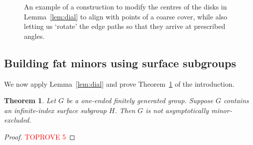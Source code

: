 \documentclass[10pt,a4paper]{amsart}
\newtheorem{theorem}{Theorem}[section]
\theoremstyle{definition}
\begin{document}
\begin{figure}[t]

\caption{An example of a construction to modify the centres of the disks in Lemma~\ref{lem:dial} to align with points of a coarse cover, while also letting us `rotate' the edge paths so that they arrive at prescribed angles. }\label{fig:circles}

\end{figure}
	


\subsection{Building fat minors using surface subgroups}

We now apply Lemma~\ref{lem:dial} and prove Theorem~\ref{thm:surface-subgroup} of the introduction. 


\begin{theorem}\label{thm:surface-subgroup}
	Let $G$ be a one-ended finitely generated group. Suppose $G$ contains an infinite-index surface subgroup $H$. Then $G$ is not asymptotically minor-excluded. 
\end{theorem}


\begin{proof}\textcolor{red}{TOPROVE 5}\end{proof}
\end{document}
